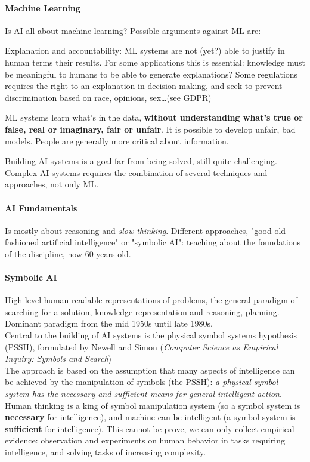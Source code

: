 \documentclass[10pt]{report}
\begin{document}
\paragraph{Machine Learning} Is AI all about machine learning? Possible arguments against ML are:
\begin{list}{}{}
	\item Explanation and accountability: ML systems are not (yet?) able to justify in human terms their results. For some applications this is essential: knowledge must be meaningful to humans to be able to generate explanations? Some regulations requires the right to an explanation in decision-making, and seek to prevent discrimination based on race, opinions, sex\ldots (see GDPR)
	\item ML systems learn what's in the data, \textbf{without understanding what's true or false, real or imaginary, fair or unfair}. It is possible to develop unfair, bad models. People are generally more critical about information.
\end{list}
Building AI systems is a goal far from being solved, still quite challenging. Complex AI systems requires the combination of several techniques and approaches, not only ML.
\paragraph{AI Fundamentals} Is mostly about reasoning and \textit{slow thinking}. Different approaches, "good old-fashioned artificial intelligence" or "symbolic AI": teaching about the foundations of the discipline, now 60 years old.
\paragraph{Symbolic AI} High-level human readable representations of problems, the general paradigm of searching for a solution, knowledge representation and reasoning, planning. Dominant paradigm from the mid 1950s until late 1980s.\\
Central to the building of AI systems is the physical symbol systems hypothesis (PSSH), formulated by Newell and Simon (\textit{Computer Science as Empirical Inquiry: Symbols and Search})\\
The approach is based on the assumption that many aspects of intelligence can be achieved by the manipulation of symbols (the PSSH): \textit{a physical symbol system has the necessary and sufficient means for general intelligent action}.\\
Human thinking is a king of symbol manipulation system (so a symbol system is \textbf{necessary} for intelligence), and machine can be intelligent (a symbol system is \textbf{sufficient} for intelligence). This cannot be prove, we can only collect empirical evidence: observation and experiments on human behavior in tasks requiring intelligence, and solving tasks of increasing complexity.
\end{document}
